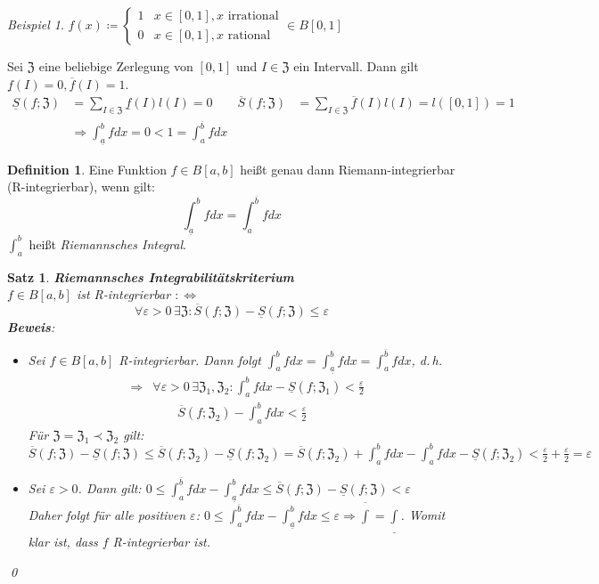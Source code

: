\documentclass[ngerman,titlepage,twoside, parskip=half*]{scrreprt}
\newcommand*{\ZZ}{\mathfrak{Z}}
\newcommand*{\perdef}{:\Leftrightarrow}
\theoremstyle{plain}
\newtheorem{theorem}{Satz}[section]
\theoremstyle{definition}
\newtheorem{definition}{Definition}
\theoremstyle{remark}
\newtheorem*{beispiel}{Beispiel}
\begin{document}
\begin{beispiel}
$f(x)\coloneqq
\begin{cases}
  1 & x\in [0,1], x \text{ irrational}\\
  0 & x\in [0,1], x \text{ rational}
\end{cases} \in B[0,1]$

Sei $\ZZ$ eine beliebige Zerlegung von $[0,1]$ und $I\in \ZZ$ ein Intervall.
Dann gilt $\underline{f}(I)=0, \overline{f}(I)=1$.
\begin{align*}
  \underline{S}(f;\ZZ)&= \sum_{I\in\ZZ} \underline{f}(I)l(I)=0&
  \overline{S}(f;\ZZ)&= \sum_{I\in\ZZ} \overline{f}(I)l(I)=l([0,1])=1\\
  &\Rightarrow \int_{\underline{a}}^b fdx =0 < 1= \int_a^{\overline{b}} fdx
\end{align*}
\end{beispiel}

\begin{definition}
  Eine Funktion $f\in B[a,b]$ heißt genau dann Riemann-integrierbar
  (R-integrierbar), wenn gilt:
  \[\int_{\underline{a}}^b fdx = \int_a^{\overline{b}} fdx\]
  $\int_a^b$ heißt \emph{Riemannsches Integral}.
\end{definition}

\begin{theorem}
  \textbf{Riemannsches Integrabilitätskriterium}\\
  $f\in B[a,b]$ ist R-integrierbar $\perdef$
  \[\forall \varepsilon>0\,\exists \ZZ \colon \overline{S}(f;\ZZ)-
  \underline{S}(f;\ZZ)\leq \varepsilon\]
  \textbf{Beweis}:
  \begin{itemize}
    \item["`$\Rightarrow$"'] Sei $f\in B[a,b]$ R-integrierbar. Dann folgt
      $\int_a^b fdx=\int_{\underline{a}}^b fdx = \int_a^{\overline{b}} fdx$,
      d.\,h.
      \begin{align}
        &\Rightarrow& \forall\varepsilon>0\,\exists\ZZ_1,\ZZ_2\colon\int_a^b fdx
        -\underline{S}(f;\ZZ_1)<\frac{\varepsilon}{2}\\
        & & \qquad \overline{S}(f;\ZZ_2)-\int_a^b fdx < \frac{\varepsilon}{2}
      \end{align}
      Für $\ZZ=\ZZ_1\prec\ZZ_2$ gilt: $\overline{S}(f;\ZZ)-\underline{S}(f;\ZZ)
      \leq \overline{S}(f;\ZZ_2)-\underline{S}(f;\ZZ_2) = 
      \overline{S}(f;\ZZ_2)+\int_a^b fdx-\int_a^b fdx-\underline{S}(f;\ZZ_2)
      <\frac{\varepsilon}{2}+\frac{\varepsilon}{2}=\varepsilon$
    \item["`$\Leftrightarrow$"'] Sei $\varepsilon>0$. Dann gilt: $0\leq
      \int_a^{\overline{b}} fdx - \int_{\underline{a}}^b fdx\leq
      \overline{S}(f;\ZZ)-\underline{S}(f;\ZZ)<\varepsilon$\\
      Daher folgt für alle positiven $\varepsilon$: $0\leq
      \int_a^{\overline{b}} fdx - \int_{\underline{a}}^b fdx\leq \varepsilon
      \Rightarrow \overline{\int}=\underline{\int}$. Womit klar ist, dass $f$ 
      R-integrierbar ist.
  \end{itemize}
  \qed
\end{theorem}
\end{document}
